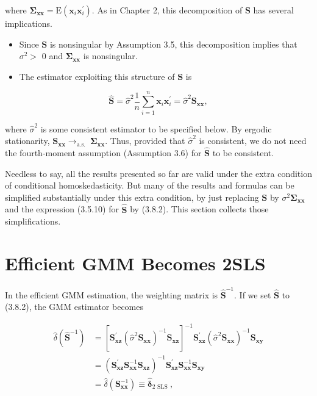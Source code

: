 \documentclass[10pt]{article}
\begin{document}
where $\mathbf{\Sigma}_{\mathbf{x x}}=\mathrm{E}\left(\mathbf{x}_{i} \mathbf{x}_{i}^{\prime}\right)$. As in Chapter 2, this decomposition of $\mathbf{S}$ has several implications.

\begin{itemize}
  \item Since $\mathbf{S}$ is nonsingular by Assumption 3.5, this decomposition implies that $\sigma^{2}>$ 0 and $\boldsymbol{\Sigma}_{\mathbf{x x}}$ is nonsingular.
  \item The estimator exploiting this structure of $\mathbf{S}$ is
\end{itemize}


\begin{equation*}
\widehat{\mathbf{S}}=\hat{\sigma}^{2} \frac{1}{n} \sum_{i=1}^{n} \mathbf{x}_{i} \mathbf{x}_{i}^{\prime}=\hat{\sigma}^{2} \mathbf{S}_{\mathbf{x x}}, \tag{3.8.2}
\end{equation*}


where $\hat{\sigma}^{2}$ is some consistent estimator to be specified below. By ergodic stationarity, $\mathbf{S}_{\mathbf{x x}} \rightarrow_{\text {a.s. }} \boldsymbol{\Sigma}_{\mathbf{x x}}$. Thus, provided that $\hat{\sigma}^{2}$ is consistent, we do not need the fourth-moment assumption (Assumption 3.6) for $\widehat{\mathbf{S}}$ to be consistent.

Needless to say, all the results presented so far are valid under the extra condition of conditional homoskedasticity. But many of the results and formulas can be simplified substantially under this extra condition, by just replacing $\mathbf{S}$ by $\sigma^{2} \boldsymbol{\Sigma}_{\mathbf{x x}}$ and the expression (3.5.10) for $\widehat{\mathbf{S}}$ by (3.8.2). This section collects those simplifications.

\section*{Efficient GMM Becomes 2SLS}
In the efficient GMM estimation, the weighting matrix is $\widehat{\mathbf{S}}^{-1}$. If we set $\widehat{\mathbf{S}}$ to (3.8.2), the GMM estimator becomes


\begin{align*}
\hat{\delta}\left(\widehat{\mathbf{S}}^{-1}\right) & =\left[\mathbf{S}_{\mathbf{x z}}^{\prime}\left(\hat{\sigma}^{2} \mathbf{S}_{\mathbf{x x}}\right)^{-1} \mathbf{S}_{\mathbf{x z}}\right]^{-1} \mathbf{S}_{\mathbf{x z}}^{\prime}\left(\hat{\sigma}^{2} \mathbf{S}_{\mathbf{x x}}\right)^{-1} \mathbf{S}_{\mathbf{x y}} \\
& =\left(\mathbf{S}_{\mathbf{x z}}^{\prime} \mathbf{S}_{\mathbf{x x}}^{-1} \mathbf{S}_{\mathbf{x z}}\right)^{-1} \mathbf{S}_{\mathbf{x z}}^{\prime} \mathbf{S}_{\mathbf{x x}}^{-1} \mathbf{S}_{\mathbf{x y}} \\
& =\hat{\delta}\left(\mathbf{S}_{\mathbf{x x}}^{-1}\right) \equiv \hat{\boldsymbol{\delta}}_{2 \text { SLS }}, \tag{3.8.3}
\end{align*}
\end{document}
